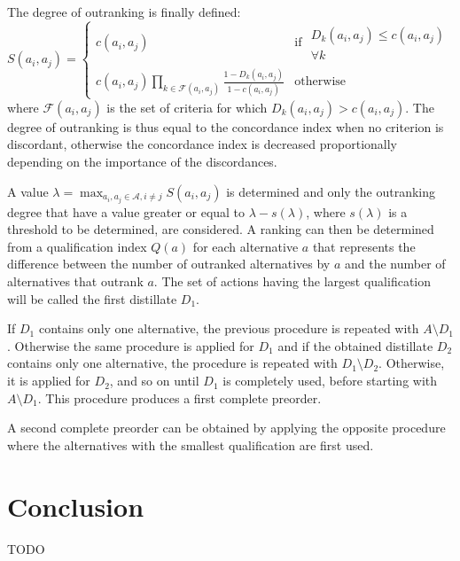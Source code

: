 \begin{enumerate}
The degree of outranking is finally defined:
\begin{equation}
S(a_i,a_j) = \begin{cases}
	c(a_i,a_j) & \text{if } \begin{array}{rr}D_k(a_i,a_j) \leq c(a_i,a_j)\\
		\forall k \end{array}\\
	c(a_i,a_j) \prod_{k \in \mathcal{F}(a_i,a_j)} \frac{1-D_k(a_i,a_j)}{1-c(a_i,a_j)} & \text{otherwise}
	\end{cases}
\end{equation}
where $\mathcal{F}(a_i,a_j)$ is the set of criteria for which $D_k(a_i,a_j) > c(a_i,a_j)$. The degree of outranking is thus equal to the concordance index when no criterion is discordant, otherwise the concordance index is decreased proportionally depending on the importance of the discordances.

A value $\lambda = \max_{a_i,a_j \in \mathcal{A}, i \neq j} S(a_i, a_j)$ is determined and only the outranking degree that have a value greater or equal to $\lambda - s(\lambda)$, where $s(\lambda)$ is a threshold to be determined, are considered. A ranking can then be determined from a qualification index $Q(a)$ for each alternative $a$ that represents the difference between the number of outranked alternatives by $a$ and the number of alternatives that outrank $a$. The set of actions having the largest qualification will be called the first distillate $D_1$.

If $D_1$ contains only one alternative, the previous procedure is repeated with $A \setminus D_1$. Otherwise the same procedure is applied for $D_1$ and if the obtained distillate $D_2$ contains only one alternative, the procedure is repeated with $D_1 \setminus D_2$. Otherwise, it is applied for $D_2$, and so on until $D_1$ is completely used, before starting with $A \setminus D_1$. This procedure produces a first complete preorder.

A second complete preorder can be obtained by applying the opposite procedure where the alternatives with the smallest qualification are first used.

%
\end{enumerate}

\section{Conclusion}
TODO